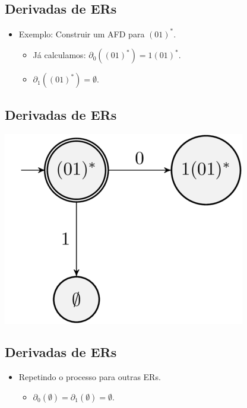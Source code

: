 \documentclass[11pt]{article}
\begin{document}
\subsection*{Derivadas de ERs}
\label{sec:org0376109}

\begin{itemize}
\item Exemplo: Construir um AFD para \((01)^*\).
\begin{itemize}
\item Já calculamos: \(\partial_{0}((01)^*) = 1(01)^*\).
\item \(\partial_{1}((01)^*) = \emptyset\).
\end{itemize}
\end{itemize}
\subsection*{Derivadas de ERs}
\label{sec:org61ac2c9}

\begin{center}
\includegraphics[width=.9\linewidth]{./imgs/image1.png}
\end{center}
\subsection*{Derivadas de ERs}
\label{sec:org78b7014}

\begin{itemize}
\item Repetindo o processo para outras ERs.
\begin{itemize}
\item \(\partial_{0}(\emptyset) = \partial_{1}(\emptyset) = \emptyset\).
\end{itemize}
\end{itemize}
\end{document}

